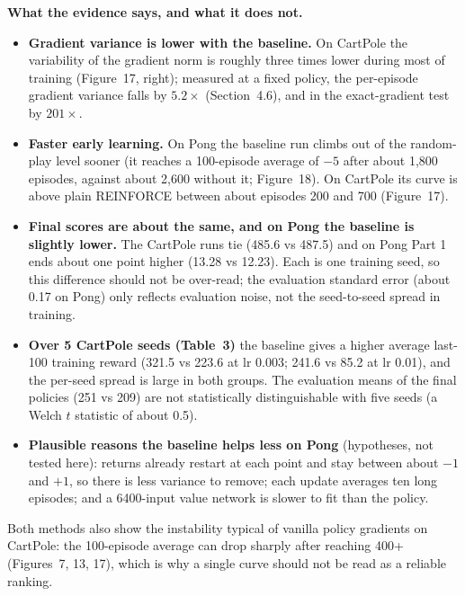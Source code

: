 \documentclass[10pt,a4paper]{article}
\begin{document}
\textbf{What the evidence says, and what it does not.}
\begin{itemize}
  \item \textbf{Gradient variance is lower with the baseline.} On CartPole the variability of the gradient norm is roughly three times
        lower during most of training (Figure~17, right); measured at a fixed policy, the per-episode gradient variance falls by
        $5.2\times$ (Section~4.6), and in the exact-gradient test by $201\times$.
  \item \textbf{Faster early learning.} On Pong the baseline run climbs out of the random-play level sooner (it reaches a 100-episode
        average of $-5$ after about 1,800 episodes, against about 2,600 without it; Figure~18). On CartPole its curve is above plain
        REINFORCE between about episodes 200 and 700 (Figure~17).
  \item \textbf{Final scores are about the same, and on Pong the baseline is slightly lower.} The CartPole runs tie (485.6 vs 487.5) and on
        Pong Part 1 ends about one point higher (13.28 vs 12.23). Each is one training seed, so this difference should not be over-read;
        the evaluation standard error (about 0.17 on Pong) only reflects evaluation noise, not the seed-to-seed spread in training.
  \item \textbf{Over 5 CartPole seeds (Table~3)} the baseline gives a higher average last-100 training reward (321.5 vs 223.6 at lr 0.003;
        241.6 vs 85.2 at lr 0.01), and the per-seed spread is large in both groups. The evaluation means of the final policies (251 vs 209)
        are not statistically distinguishable with five seeds (a Welch $t$ statistic of about 0.5).
  \item \textbf{Plausible reasons the baseline helps less on Pong} (hypotheses, not tested here): returns already restart at each point and
        stay between about $-1$ and $+1$, so there is less variance to remove; each update averages ten long episodes; and a 6400-input
        value network is slower to fit than the policy.
\end{itemize}
Both methods also show the instability typical of vanilla policy gradients on CartPole: the 100-episode average can drop sharply after
reaching 400+ (Figures~7, 13, 17), which is why a single curve should not be read as a reliable ranking.
\end{document}
